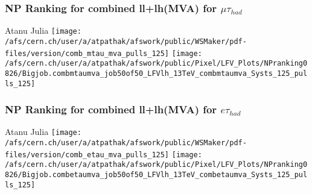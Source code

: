 \documentclass{beamer}
\begin{document}
\begin{frame}
\frametitle{NP Ranking for combined ll+lh(MVA) for $\mu\tau_{had}$}
\begin{normalsize}
\hspace{1.2in} Atanu
\hspace{1.5in} Julia
\vspace*{0.2cm}
\texttt{[image: /afs/cern.ch/user/a/atpathak/afswork/public/WSMaker/pdf-files/version/comb\_mtau\_mva\_pulls\_125]}
\texttt{[image: /afs/cern.ch/user/a/atpathak/afswork/public/Pixel/LFV\_Plots/NPranking0826/Bigjob.combmtaumva\_job50of50\_LFVlh\_13TeV\_combmtaumva\_Systs\_125\_pulls\_125]}
\end{normalsize}
\end{frame}
\begin{frame}
\frametitle{NP Ranking for combined ll+lh(MVA) for $e\tau_{had}$}
\begin{normalsize}
\hspace{1.2in} Atanu
\hspace{1.5in} Julia
\vspace*{0.2cm}
\texttt{[image: /afs/cern.ch/user/a/atpathak/afswork/public/WSMaker/pdf-files/version/comb\_etau\_mva\_pulls\_125]}
\texttt{[image: /afs/cern.ch/user/a/atpathak/afswork/public/Pixel/LFV\_Plots/NPranking0826/Bigjob.combetaumva\_job50of50\_LFVlh\_13TeV\_combetaumva\_Systs\_125\_pulls\_125]}
\end{normalsize}
\end{frame}
\end{document}
